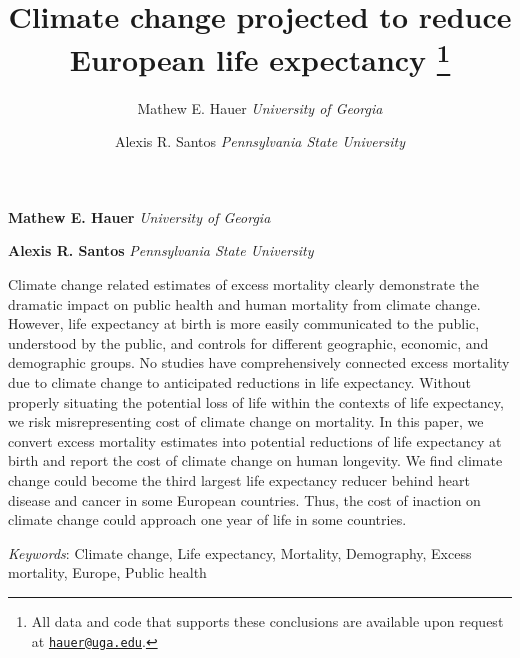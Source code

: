 \documentclass[12pt,]{article}
\title{Climate change projected to reduce European life expectancy \thanks{All data and code that supports these conclusions are available upon
request at \href{mailto:hauer@uga.edu}{\nolinkurl{hauer@uga.edu}}.}  }
\author{\Large Mathew E. Hauer\vspace{0.05in} \newline\normalsize\emph{University of Georgia}   \and \Large Alexis R. Santos\vspace{0.05in} \newline\normalsize\emph{Pennsylvania State University}  }
\date{}
\newcommand*{\authorfont}{\fontfamily{phv}\selectfont}
\renewenvironment{abstract}
 {{%
    \setlength{\leftmargin}{0mm}
    \setlength{\rightmargin}{\leftmargin}%
  }%
  \relax}
 {\endlist}
\begin{document}
	
%

{%
\setlength{\parindent}{0pt}
\thispagestyle{plain}
{\fontsize{18}{20}\selectfont\raggedright 
\maketitle  %

}

{
   \vskip 13.5pt\relax \normalsize\fontsize{11}{12} 
\textbf{\authorfont Mathew E. Hauer} \hskip 15pt \emph{\small University of Georgia}   \par \textbf{\authorfont Alexis R. Santos} \hskip 15pt \emph{\small Pennsylvania State University}   

}

}








\begin{abstract}

    \hbox{\vrule height .2pt width 39.14pc}

    \vskip 8.5pt %

\noindent Climate change related estimates of excess mortality clearly demonstrate
the dramatic impact on public health and human mortality from climate
change. However, life expectancy at birth is more easily communicated to
the public, understood by the public, and controls for different
geographic, economic, and demographic groups. No studies have
comprehensively connected excess mortality due to climate change to
anticipated reductions in life expectancy. Without properly situating
the potential loss of life within the contexts of life expectancy, we
risk misrepresenting cost of climate change on mortality. In this paper,
we convert excess mortality estimates into potential reductions of life
expectancy at birth and report the cost of climate change on human
longevity. We find climate change could become the third largest life
expectancy reducer behind heart disease and cancer in some European
countries. Thus, the cost of inaction on climate change could approach
one year of life in some countries.


\vskip 8.5pt \noindent \emph{Keywords}: Climate change, Life expectancy, Mortality, Demography, Excess
mortality, Europe, Public health \par

    \hbox{\vrule height .2pt width 39.14pc}



\end{abstract}
\end{document}

